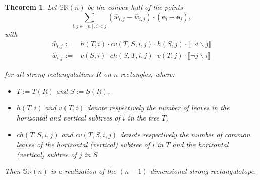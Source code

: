 \documentclass{amsart}
\newtheorem{theorem}{Theorem}%
\theoremstyle{definition}
\newcommand{\polytope}[1]{\mathds{#1}} %
\newcommand{\SRP}{\polytope{SR}} %
\newcommand{\yang}[1]{\overset{\backsim}{#1}}
\newcommand{\yin}[1]{\overset{\sim}{#1}}
\begin{document}
\begin{theorem}
  Let $\SRP (n)$ be the convex hull of the points
  \[
  \sum_{i,j\in [n], i< j} (\yin{w}_{i,j} - \yang{w}_{i,j})\cdot (\mathbf{e}_i - \mathbf{e}_j),
  \]
  with
  \[
  \begin{split}
    \yin{w}_{i,j} := & h(T, i) \cdot cv (T, S, i, j)\cdot h(S, j)\cdot \llbracket \neg i\backslash j \rrbracket \\%
    \yang{w}_{i,j} := & v(S, i) \cdot ch (S, T, i, j)\cdot v(T, j) \cdot \llbracket \neg j\backslash i \rrbracket
  \end{split}
  \]
  


  for all strong rectangulations $R$ on $n$ rectangles, where:
  \begin{itemize}
  \item $T := T(R)$ and $S:=S(R)$,
  \item $h(T,i)$ and $v(T,i)$ denote respectively the number of leaves in the horizontal and vertical subtrees of $i$ in the tree $T$,
  \item $ch (T,S,i,j)$ and $cv (T,S,i,j)$ denote respectively the number of common leaves of the horizontal (vertical) subtree of $i$ in $T$ and the horizontal (vertical) subtree of $j$ in $S$
  \end{itemize}
Then $\SRP (n)$ is a realization of the $(n-1)$-dimensional strong rectangulotope.  
\end{theorem}

\end{document}
